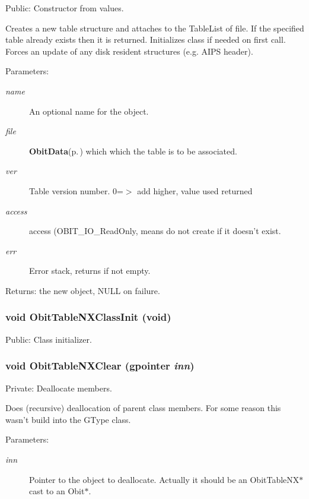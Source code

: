 Public: Constructor from values. 

Creates a new table structure and attaches to the Table\-List of file. If the specified table already exists then it is returned. Initializes class if needed on first call. Forces an update of any disk resident structures (e.g. AIPS header). \begin{Desc}
\item[Parameters:]
\begin{description}
\item[{\em name}]An optional name for the object. \item[{\em file}]{\bf Obit\-Data}{\rm (p.\,\pageref{structObitData})} which which the table is to be associated. \item[{\em ver}]Table version number. 0=$>$ add higher, value used returned \item[{\em access}]access (OBIT\_\-IO\_\-Read\-Only, means do not create if it doesn't exist. \item[{\em err}]Error stack, returns if not empty. \end{description}
\end{Desc}
\begin{Desc}
\item[Returns:]the new object, NULL on failure. \end{Desc}
\subsubsection{\setlength{\rightskip}{0pt plus 5cm}void Obit\-Table\-NXClass\-Init (void)}\label{ObitTableNX_8c_a27}


Public: Class initializer. 

\subsubsection{\setlength{\rightskip}{0pt plus 5cm}void Obit\-Table\-NXClear (gpointer {\em inn})}\label{ObitTableNX_8c_a9}


Private: Deallocate members. 

Does (recursive) deallocation of parent class members. For some reason this wasn't build into the GType class. \begin{Desc}
\item[Parameters:]
\begin{description}
\item[{\em inn}]Pointer to the object to deallocate. Actually it should be an Obit\-Table\-NX$\ast$ cast to an Obit$\ast$. \end{description}
\end{Desc}
